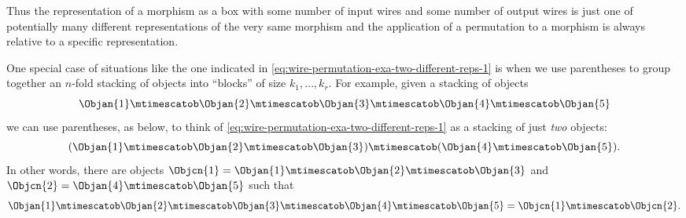 Thus the representation of a morphism as a box with some number of input wires and some number of output wires is just one of potentially many different representations of the very same morphism and the application of a permutation to a morphism is always relative to a specific representation.

One special case of situations like the one indicated in \cref{eq:wire-permutation-exa-two-different-reps-1} is when we use parentheses to group together an $n$-fold stacking of objects into ``blocks'' of size $k_1, \dots, k_r$.
For example, given a stacking of objects
\begin{equation}\label{eq:wire-permutation-exa-two-different-reps-2}
    \Objan{1} \mtimescatob \Objan{2} \mtimescatob \Objan{3} \mtimescatob \Objan{4} \mtimescatob \Objan{5}
\end{equation}
we can use parentheses, as below, to think of \cref{eq:wire-permutation-exa-two-different-reps-1} as a stacking of just \emph{two} objects:
\begin{equation}\label{eq:wire-permutation-exa-two-different-reps-3}
    (\Objan{1} \mtimescatob \Objan{2} \mtimescatob \Objan{3}) \mtimescatob (\Objan{4} \mtimescatob \Objan{5}).
\end{equation}
In other words, there are objects $\Objcn{1} = \Objan{1} \mtimescatob \Objan{2} \mtimescatob \Objan{3}$ and $\Objcn{2} = \Objan{4} \mtimescatob \Objan{5}$ such that
\begin{equation}
    \Objan{1} \mtimescatob \Objan{2} \mtimescatob \Objan{3} \mtimescatob \Objan{4} \mtimescatob \Objan{5} = \Objcn{1} \mtimescatob \Objcn{2}.
\end{equation}

\begin{marginfigure}
    \centering
    \caption{A diagram for a source permutation map.}
    \label{fig:symmetric-stacking-left-perm}
\end{marginfigure}

\begin{marginfigure}
    \centering
    \caption{A diagram for a target permutation map.}
\end{marginfigure}

\begin{marginfigure}
    \centering
    \caption{A source permutation applied to a morphism $\mora \colon \Obja \mto \Objb$ whose source has a factorization $\Obja = \Objan{1} \mtimescatob \Objan{2}  \mtimescatob \Objan{3}$ and whose target has a factorization $\Objb = \Objbn{1} \mtimescatob \Objbn{2}  \mtimescatob \Objbn{3}$.}
    \label{fig:symmetric-stacking-left-perm-evaluated}
\end{marginfigure}

